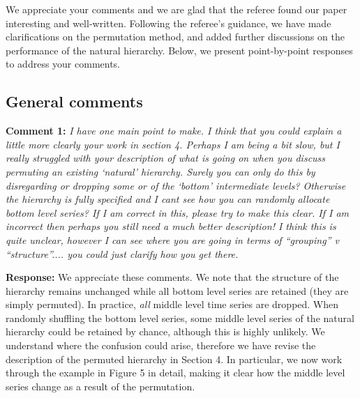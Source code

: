 \documentclass{article}
\numberwithin{equation}{section}
\theoremstyle{plain}
\theoremstyle{definition}
\theoremstyle{remark}
\begin{document}
We appreciate your comments and we are glad that the referee found our paper interesting and well-written. Following the referee's guidance, we have made clarifications on the permutation method, and added further discussions on the performance of the natural hierarchy. Below, we present point-by-point responses to address your comments. 

\subsection*{General comments}




\textbf{Comment 1:} \textit{I have one main point to make. I think that you could explain a little more clearly your work in section 4. Perhaps I am being a bit slow, but I really struggled with your description of what is going on when you discuss permuting an existing `natural' hierarchy. Surely you can only do this by disregarding or dropping some or of the `bottom' intermediate levels? Otherwise the hierarchy is fully specified and I cant see how you can randomly allocate bottom level series? If I am correct in this, please try to make this clear. If I am incorrect then perhaps you still need a much better description! I think this is quite unclear, however I can see where you are going in terms of ``grouping'' v ``structure''.... you could just clarify how you get there.}

\medskip

\noindent \textbf{Response:} We appreciate these comments.
We note that the structure of the hierarchy remains unchanged while all bottom level series are retained (they are simply permuted). In practice, \textit{all} middle level time series are dropped. When randomly shuffling the bottom level series, some middle level series of the natural hierarchy could be retained by chance, although this is highly unlikely. We understand where the confusion could arise, therefore we have revise the description of the permuted hierarchy in Section 4. In particular, we now work through the example in Figure 5 in detail, making it clear how the middle level series change as a result of the permutation. \\



\end{document}
